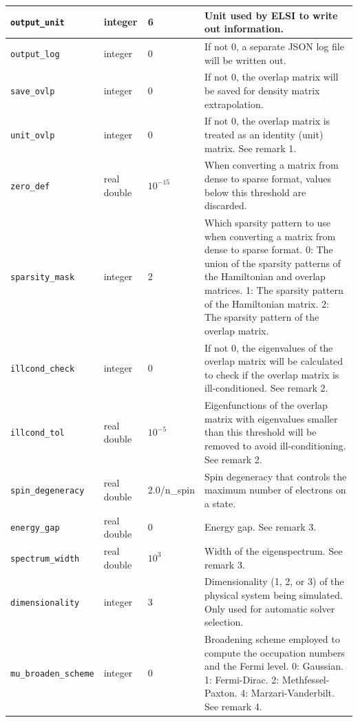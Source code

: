 \documentclass{report}
\begin{document}
\begin{longtable}[]{|p{30mm}|p{20mm}|p{15mm}|p{97mm}|}
\hline
\texttt{output\_unit}        & integer          & 6           & Unit used by ELSI to write out information.\\
\hline
\texttt{output\_log}         & integer          & 0           & If not 0, a separate JSON log file will be written out.\\
\hline
\texttt{save\_ovlp}          & integer          & 0           & If not 0, the overlap matrix will be saved for density matrix extrapolation.\\
\hline
\texttt{unit\_ovlp}          & integer          & 0           & If not 0, the overlap matrix is treated as an identity (unit) matrix. See remark 1.\\
\hline
\texttt{zero\_def}           & real double      & $10^{-15}$  & When converting a matrix from dense to sparse format, values below this threshold are discarded.\\
\hline
\texttt{sparsity\_mask}      & integer          & 2           & Which sparsity pattern to use when converting a matrix from dense to sparse format. 0: The union of the sparsity patterns of the Hamiltonian and overlap matrices. 1: The sparsity pattern of the Hamiltonian matrix. 2: The sparsity pattern of the overlap matrix.\\
\hline
\texttt{illcond\_check}      & integer          & 0           & If not 0, the eigenvalues of the overlap matrix will be calculated to check if the overlap matrix is ill-conditioned. See remark 2.\\
\hline
\texttt{illcond\_tol}        & real double      & $10^{-5}$   & Eigenfunctions of the overlap matrix with eigenvalues smaller than this threshold will be removed to avoid ill-conditioning. See remark 2.\\
\hline
\texttt{spin\_degeneracy}    & real double      & 2.0/n\_spin & Spin degeneracy that controls the maximum number of electrons on a state.\\
\hline
\texttt{energy\_gap}         & real double      & 0           & Energy gap. See remark 3.\\
\hline
\texttt{spectrum\_width}     & real double      & $10^{3}$    & Width of the eigenspectrum. See remark 3.\\
\hline
\texttt{dimensionality}      & integer          & 3           & Dimensionality (1, 2, or 3) of the physical system being simulated. Only used for automatic solver selection.\\
\hline
\texttt{mu\_broaden\_scheme} & integer          & 0           & Broadening scheme employed to compute the occupation numbers and the Fermi level. 0: Gaussian. 1: Fermi-Dirac. 2: Methfessel-Paxton. 4: Marzari-Vanderbilt. See remark 4.\\

\end{longtable}
\end{document}
